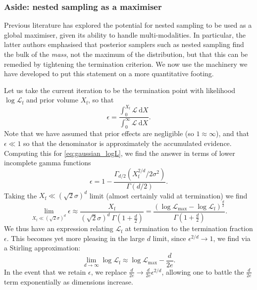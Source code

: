 \documentclass[usenatbib]{mnras}
\newcommand{\Like}{\mathcal{L}}
\begin{document}
\subsubsection*{Aside: nested sampling as a maximiser}
Previous literature \citep{Akrami_2010, Feroz_2011} has explored the potential for nested sampling to be used as a global maximiser, given its ability to handle multi-modalities. In particular, the latter authors emphasised that posterior samplers such as nested sampling find the bulk of the \textit{mass}, not the maximum of the distribution, but that this can be remedied by tightening the termination criterion. We now use the machinery we have developed to put this statement on a more quantitative footing. 
\par
Let us take the current iteration to be the termination point with likelihood $\log\Like_\mathrm{f}$ and prior volume $X_\mathrm{f}$, so that
\begin{equation}
	\epsilon = \frac{\int_0^{X_\mathrm{f}} \mathcal{L}\ \mathrm{d}X}{\int_0^\infty \mathcal{L}\ \mathrm{d}X}.
\end{equation}
Note that we have assumed that prior effects are negligible (so $1\approx \infty$), and that $\epsilon \ll 1$ so that the denominator is approximately the accumulated evidence. Computing this for \eqref{eq:gaussian_logL}, we find the answer in terms of lower incomplete gamma functions
\begin{equation}
\epsilon = 1- \frac{\Gamma_{d/2}\left(X_\mathrm{f}^{2/d}/2\sigma^2\right)}{\Gamma(d/2)}.
\end{equation}
Taking the $X_\mathrm{f}\ll (\sqrt{2}\sigma)^d$ limit (almost certainly valid at termination) we find
\begin{equation}
    \lim_{X_\mathrm{f}\ll (\sqrt{2}\sigma)^d} \epsilon \approx \frac{X_\mathrm{f}}{(\sqrt{2}\sigma)^d \ \Gamma\left(1+\frac{d}{2}\right)} = \frac{(\log\mathcal{L}_\mathrm{max}-\log\mathcal{L}_\mathrm{f})^{\frac{d}{2}}}{\Gamma\left(1+\frac{d}{2}\right)}.
\end{equation}
We thus have an expression relating $\mathcal{L}_\mathrm{f}$ at termination to the termination fraction $\epsilon$. This becomes yet more pleasing in the large $d$ limit, since $\epsilon^{2/d}\to 1$, we find via a Stirling approximation:
\begin{equation}
    \lim_{d\to\infty} \log\mathcal{L}_\mathrm{f} \approx \log\mathcal{L}_\mathrm{max} - \frac{d}{2e}.
\end{equation}
In the event that we retain $\epsilon$, we replace $\frac{d}{2e}\to \frac{d}{2e}\epsilon^{2/d}$, allowing one to battle the $\frac{d}{2e}$ term exponentially as dimensions increase.
\end{document}
